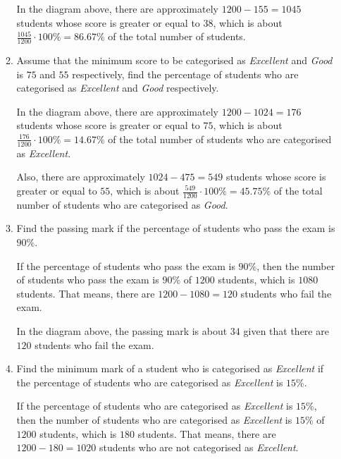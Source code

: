 \documentclass{report}
\begin{document}
\begin{multicols}{2}
\begin{enumerate}
\begin{enumerate}
                  In the diagram above, there are approximately $1200 - 155 = 1045$ students
                  whose score is greater or equal to $38$, which is about $\frac{1045}{1200}
                    \cdot 100\% = 86.67\%$ of the total number of students.

            \item Assume that the minimum score to be categorised as \textit{Excellent} and
                  \textit{Good} is $75$ and $55$ respectively, find the percentage of students
                  who are categorised as \textit{Excellent} and \textit{Good} respectively.
                  \sol{}

                  In the diagram above, there are approximately $1200 - 1024 = 176$ students
                  whose score is greater or equal to $75$, which is about $\frac{176}{1200} \cdot
                    100\% = 14.67\%$ of the total number of students who are categorised as
                  \textit{Excellent}.

                  Also, there are approximately $1024 - 475 = 549$ students whose score is
                  greater or equal to $55$, which is about $\frac{549}{1200} \cdot 100\% =
                    45.75\%$ of the total number of students who are categorised as \textit{Good}.

            \item Find the passing mark if the percentage of students who pass the exam is
                  $90\%$. \sol{}

                  If the percentage of students who pass the exam is $90\%$, then the number of
                  students who pass the exam is $90\%$ of $1200$ students, which is $1080$
                  students. That means, there are $1200 - 1080 = 120$ students who fail the exam.

                  In the diagram above, the passing mark is about $34$ given that there are $120$
                  students who fail the exam.

            \item Find the minimum mark of a student who is categorised as \textit{Excellent} if
                  the percentage of students who are categorised as \textit{Excellent} is $15\%$.
                  \sol{}

                  If the percentage of students who are categorised as \textit{Excellent} is
                  $15\%$, then the number of students who are categorised as \textit{Excellent}
                  is $15\%$ of $1200$ students, which is $180$ students. That means, there are
                  $1200 - 180 = 1020$ students who are not categorised as \textit{Excellent}.


\end{enumerate}
\end{enumerate}
\end{multicols}
\end{document}
